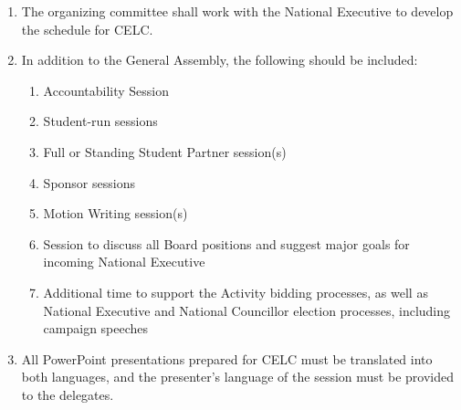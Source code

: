 \begin{enumerate}
 \item
  The organizing committee shall work with the National Executive to develop the schedule for CELC.
 \item
  In addition to the General Assembly, the following should be included:

  \begin{enumerate}
   \item
    Accountability Session
   \item
    Student-run sessions
   \item
    Full or Standing Student Partner session(s)
   \item
    Sponsor sessions
   \item
    Motion Writing session(s)
   \item
    Session to discuss all Board positions and suggest major goals for incoming National Executive
   \item
    Additional time to support the Activity bidding processes, as well as National Executive and National Councillor election processes, including campaign speeches
  \end{enumerate}

 \item
  All PowerPoint presentations prepared for CELC must be translated into both languages, and the presenter's language of the session must be provided to the delegates.
\end{enumerate}

